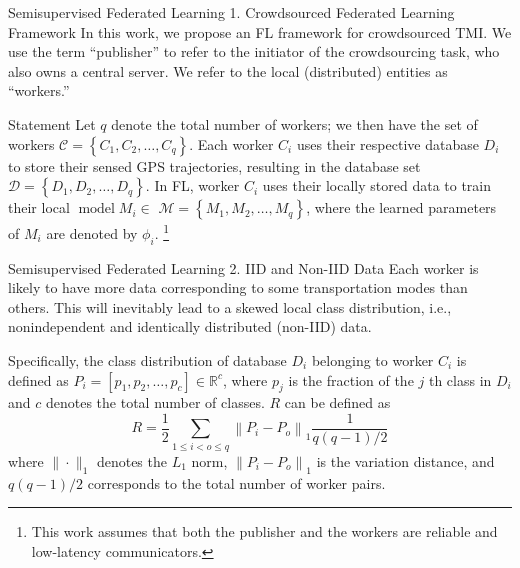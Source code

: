 \documentclass[UTF8]{beamer}
\begin{document}
\begin{frame}
{Semisupervised Federated Learning}
{1. Crowdsourced Federated Learning Framework}
In this work, we propose an FL framework for crowdsourced TMI. We use the term “publisher” to refer to the initiator of the crowdsourcing task, who also owns a central server. We refer to the local (distributed) entities as “workers.”
\begin{block}{Statement}
Let $q$ denote the total number of workers; we then have the set of workers $\mathcal{C}=\left\{C_1, C_2, \ldots, C_q\right\}$. Each worker $C_i$ uses their respective database $D_i$ to store their sensed GPS trajectories, resulting in the database set $\mathcal{D}=\left\{D_1, D_2, \ldots, D_q\right\}$. In FL, worker $C_i$ uses their locally stored data to train their local $\operatorname{model} M_i \in$ $\mathcal{M}=\left\{M_1, M_2, \ldots, M_q\right\}$, where the learned parameters of $M_i$ are denoted by $\phi_i$.
\footnote{This work assumes that both the publisher and the workers are reliable and low-latency communicators.}
\end{block}

\end{frame}

\begin{frame}
{Semisupervised Federated Learning}
{2. IID and Non-IID Data}
Each worker is likely to have more data corresponding to some transportation modes than others. This will inevitably lead to a skewed local class distribution, i.e., nonindependent and identically distributed (non-IID) data.

\begin{definition}
Specifically, the class distribution of database $D_i$ belonging to worker $C_i$ is defined as $P_i=\left[p_1, p_2, \ldots, p_c\right] \in \mathbb{R}^c$, where $p_j$ is the fraction of the $j$ th class in $D_i$ and $c$ denotes the total number of classes. $R$ can be defined as
$$
R=\frac{1}{2} \sum_{1 \leq i<o \leq q}\left\|P_i-P_o\right\|_1 \frac{1}{q(q-1) / 2}
$$
where $\|\cdot\|_1$ denotes the $L_1$ norm, $\left\|P_i-P_o\right\|_1$ is the variation distance, and $q(q-1) / 2$ corresponds to the total number of worker pairs. 
\end{definition}
\end{frame}

\end{document}
